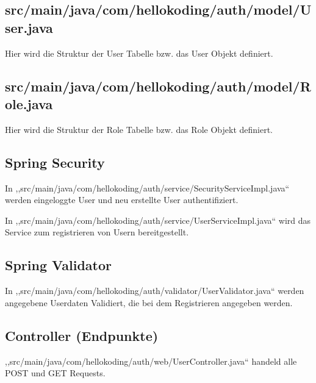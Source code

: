 \subsection{src/main/java/com/hellokoding/auth/model/User.java}
Hier wird die Struktur der User Tabelle bzw. das User Objekt definiert.

\subsection{src/main/java/com/hellokoding/auth/model/Role.java}
Hier wird die Struktur der Role Tabelle bzw. das Role Objekt definiert.

\subsection{Spring Security}
In ,,src/main/java/com/hellokoding/auth/service/SecurityServiceImpl.java`` werden eingeloggte User und neu erstellte User authentifiziert.

In ,,src/main/java/com/hellokoding/auth/service/UserServiceImpl.java`` wird das Service zum registrieren von Usern bereitgestellt.

\subsection{Spring Validator}  
In ,,src/main/java/com/hellokoding/auth/validator/UserValidator.java`` werden angegebene Userdaten Validiert, die bei dem Registrieren angegeben werden.

\subsection{Controller (Endpunkte)}
,,src/main/java/com/hellokoding/auth/web/UserController.java`` handeld alle POST und GET Requests. 

